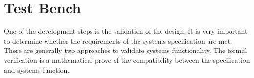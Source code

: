 \chapter{Test Bench}
One of the development steps is the validation of the design. It is very important to determine whether the requirements of the systems specification are met. There are generally two approaches to validate systems functionality. The formal verification is a mathematical prove of the compatibility between the specification and systems function. 

